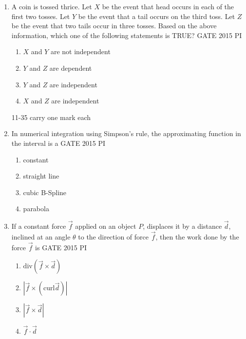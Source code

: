 \documentclass[journal,12pt,onecolumn]{IEEEtran}
\theoremstyle{remark}
\begin{document}
\begin{enumerate}
\begin{multicols}{2}
\begin{enumerate}
    \item 110
    \item 1,100
    \item 9,900
    \item 10,000
\end{enumerate}
\end{multicols}

\item A coin is tossed thrice. Let $X$ be the event that head occurs in each of the first two tosses. Let $Y$ be the event that a tail occurs on the third toss. Let $Z$ be the event that two tails occur in three tosses. Based on the above information, which one of the following statements is TRUE?
\hfill{GATE 2015 PI}

\begin{multicols}{2}
\begin{enumerate}
    \item $X$ and $Y$ are not independent
    \item $Y$ and $Z$ are dependent
    \item $Y$ and $Z$ are independent
    \item $X$ and $Z$ are independent
\end{enumerate}
\end{multicols}
11-35 carry one mark each
\item In numerical integration using Simpson's rule, the approximating function in the interval is a
\hfill{GATE 2015 PI}

\begin{multicols}{2}
\begin{enumerate}
    \item constant
    \item straight line
    \item cubic B-Spline
    \item parabola
\end{enumerate}
\end{multicols}

\item If a constant force $\vec{f}$ applied on an object $P$, displaces it by a distance $\vec{d}$, inclined at an angle $\theta$ to the direction of force $\vec{f}$, then the work done by the force $\vec{f}$ is
\hfill{GATE 2015 PI}

\begin{multicols}{2}
\begin{enumerate}
    \item $\mathrm{div}(\vec{f} \times \vec{d})$
    \item $\left| \vec{f} \times (\mathrm{curl} \vec{d}) \right|$
    \item $\left| \vec{f} \times \vec{d} \right|$
    \item $\vec{f} \cdot \vec{d}$
\end{enumerate}
\end{multicols}


\end{enumerate}
\end{document}
